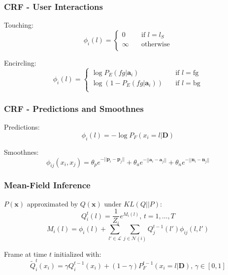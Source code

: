 \documentclass[mathserif, 10pt]{beamer}
\begin{document}
\begin{frame}
\frametitle{CRF - User Interactions}

  Touching:
  \begin{equation}
  \phi_i(l) =
    \begin{cases}
      0      & \quad \text{if } l = l_S\\
      \infty  & \quad \text{otherwise}\\
    \end{cases}
  \end{equation}

  Encircling:
  \begin{equation}
  \phi_i(l) =
    \begin{cases}
      \log P_E(fg|\mathbf{a}_i)       & \quad \text{if } l = \text{fg}\\
      \log (1 - P_E(fg|\mathbf{a}_i))  & \quad \text{if } l = \text{bg}\\
    \end{cases}
  \end{equation}

\end{frame}

\begin{frame}
\frametitle{CRF - Predictions and Smoothnes}

  Predictions:
  \begin{equation}
  \phi_i(l) = -\log P_F(x_i = l | \mathbf{D})
  \end{equation}

  Smoothnes:
  \begin{equation}
      \phi_{ij}(x_i, x_j)  = \theta_p e^{-||\mathbf{p}_i - \mathbf{p}_j||}  + \theta_a e^{-||\mathbf{a}_i - \mathbf{a}_j||} + \theta_n e^{-||\mathbf{n}_i - \mathbf{n}_j||}
  \end{equation}
\end{frame}

\begin{frame}
\frametitle{Mean-Field Inference}
$P(\mathbf{x})$ approximated by $Q(\mathbf{x})$ under $KL(Q||P)$:
\begin{equation}
 Q_i^t(l) = \frac{1}{Z_i}e^{M_i(l)} \text{, } t = 1, \ldots, T
\end{equation}
\begin{equation}
 M_i(l) = \phi_i(l) + \sum_{l' \in \mathcal{L}} \sum_{j \in \mathcal{N}(i)} Q_j^{t-1}(l')\phi_{ij}(l, l')
\end{equation}


Frame at time $t$ initialized with:
\begin{equation}
 \widetilde{Q}_i^t(x_i) = \gamma Q_i^{t-1}(x_i) + (1 - \gamma) P_F^{t-1}(x_i = l | \mathbf{D}) \text{, } \gamma \in [0, 1]
\end{equation}

\end{frame}
\end{document}
